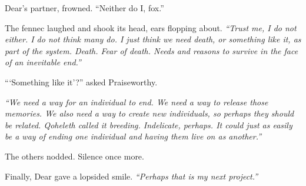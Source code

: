 Dear's partner, frowned. ``Neither do I, fox.''

The fennec laughed and shook its head, ears flopping about. \emph{``Trust me, I do not either. I do not think many do. I just think we need death, or something like it, as part of the system. Death. Fear of death. Needs and reasons to survive in the face of an inevitable end.''}

```Something like it'?'' asked Praiseworthy.

\emph{``We need a way for an individual to end. We need a way to release those memories. We also need a way to create new individuals, so perhaps they should be related. Qoheleth called it breeding. Indelicate, perhaps. It could just as easily be a way of ending one individual and having them live on as another.''}

The others nodded. Silence once more.

Finally, Dear gave a lopsided smile. \emph{``Perhaps that is my next project.''}
